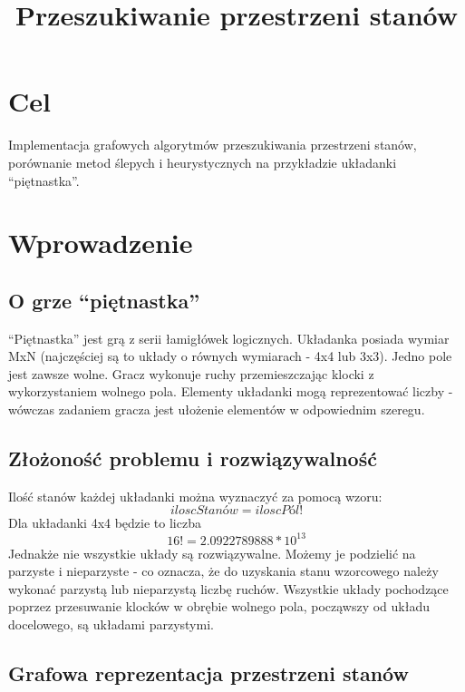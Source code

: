 \documentclass{classrep}
\author{
  \studentinfo{Marcin Pajkowski}{211968} \and
  \studentinfo{Rafał Warda}{214067}
}
\title{Przeszukiwanie przestrzeni stanów}
\begin{document}
\begin{titlepage}
\maketitle
\thispagestyle{empty}
\end{titlepage}

\section{Cel}

Implementacja grafowych algorytmów przeszukiwania przestrzeni stanów,
porównanie metod ślepych i heurystycznych na przykładzie układanki
``piętnastka''.

\section{Wprowadzenie}

\subsection{O grze ``piętnastka''}

``Piętnastka'' jest grą z serii łamigłówek logicznych. Układanka posiada
wymiar MxN (najczęściej są to układy o równych wymiarach - 4x4 lub 3x3).
Jedno pole jest zawsze wolne. Gracz wykonuje ruchy przemieszczając
klocki z wykorzystaniem wolnego pola. Elementy układanki mogą
reprezentować liczby - wówczas zadaniem gracza jest ułożenie elementów w
odpowiednim szeregu.

\subsection{Złożoność problemu i rozwiązywalność}

Ilość stanów każdej układanki można wyznaczyć za pomocą wzoru:
\[ iloscStanów = iloscPól! \] Dla układanki 4x4 będzie to liczba
\[ 16! = 2.0922789888 * 10^{13} \] Jednakże nie wszystkie układy są
rozwiązywalne. Możemy je podzielić na parzyste i nieparzyste - co
oznacza, że do uzyskania stanu wzorcowego należy wykonać parzystą lub
nieparzystą liczbę ruchów. Wszystkie układy pochodzące poprzez
przesuwanie klocków w obrębie wolnego pola, począwszy od układu
docelowego, są układami parzystymi.

\subsection{Grafowa reprezentacja przestrzeni
stanów}
\end{document}

